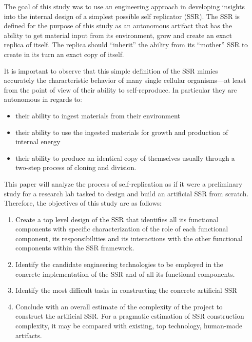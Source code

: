 The goal of this study was to use an engineering approach in developing
insights into the internal design of a simplest possible self
replicator (SSR). The SSR is defined for the purpose of this study as
an autonomous artifact that has the ability to get material input from
its environment, grow and create an exact replica of itself. The
replica should ``inherit'' the ability from its ``mother'' SSR to create in
its turn an exact copy of itself.

It is important to observe that this simple definition of the SSR mimics
accurately the characteristic behavior of many single cellular
organisms---at least from the point of view of their ability to
self-reproduce. In particular they are autonomous in regards to:

\begin{itemize}
\item their ability to ingest materials from their environment
\item their ability to use the ingested materials for growth and
production of internal energy
\item their ability to produce an identical copy of themselves usually
through a two-step process of cloning and division.
\end{itemize}

This paper will analyze the process of self-replication as if it were 
a preliminary study for a research lab tasked to design and build an
artificial SSR from scratch.  Therefore, the objectives of this study 
are as follows:

\begin{enumerate}
\item  Create a top level design of the SSR that identifies all its
functional components with specific characterization of the role of
each functional component, its responsibilities and its interactions
with the other functional components within the SSR framework.
\item  Identify the candidate engineering technologies to be employed in
the concrete implementation of the SSR and of all its functional
components.
\item  Identify the most difficult tasks in constructing the
concrete artificial SSR
\item  Conclude with an overall estimate of the complexity of the
project to construct the artificial SSR. For a pragmatic estimation of
SSR construction complexity, it may be compared with 
existing, top technology, human-made artifacts.
\end{enumerate}

